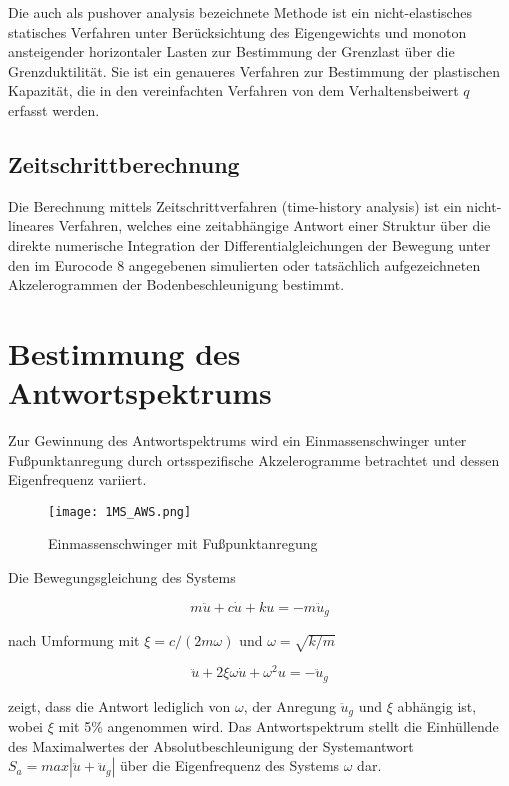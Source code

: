 Die auch als \glqq pushover analysis\grqq{} bezeichnete Methode ist ein nicht-elastisches statisches Verfahren unter Berücksichtung des Eigengewichts und monoton ansteigender horizontaler Lasten zur Bestimmung der Grenzlast über die Grenzduktilität.
Sie ist ein genaueres Verfahren zur Bestimmung der plastischen Kapazität, die in den vereinfachten Verfahren von dem Verhaltensbeiwert $q$ erfasst werden.

\subsection{Zeitschrittberechnung}
\label{sec:Zeitschrittberechnung}

Die Berechnung mittels Zeitschrittverfahren (\glqq time-history analysis\grqq{}) ist ein nicht-lineares Verfahren, welches eine zeitabhängige Antwort einer Struktur über die direkte numerische Integration der Differentialgleichungen der Bewegung unter den im Eurocode 8 angegebenen simulierten oder tatsächlich aufgezeichneten Akzelerogrammen der Bodenbeschleunigung bestimmt. 

\pagebreak

\section{Bestimmung des Antwortspektrums}
\label{sec:Antwortspektren}

Zur Gewinnung des Antwortspektrums wird ein Einmassenschwinger unter Fußpunktanregung durch ortsspezifische Akzelerogramme betrachtet und dessen Eigenfrequenz variiert.

\begin{figure}[H]
    \centering
    \texttt{[image: 1MS\_AWS.png]}
    \caption{Einmassenschwinger mit Fußpunktanregung}
\end{figure}

Die Bewegungsgleichung des Systems

\begin{equation} \label{ems_aws}
m \ddot u + c \dot u + k u = -m \ddot u_g
\end{equation}

nach Umformung mit $\xi = c/(2m\omega)$ und $\omega = \sqrt{k/m}$

\begin{equation} \label{ems_aws_umf}
\ddot u + 2\xi\omega \dot u + \omega^2 u = - \ddot u_g
\end{equation}

zeigt, dass die Antwort lediglich von $\omega$, der Anregung $\ddot u_g$ und $\xi$ abhängig ist, wobei $\xi$ mit 5\% angenommen wird.
Das Antwortspektrum stellt die Einhüllende des Maximalwertes der Absolutbeschleunigung der Systemantwort $S_a=max|\ddot u + \ddot u_g|$ über die Eigenfrequenz des Systems $\omega$ dar. \cite{Bachmann}

